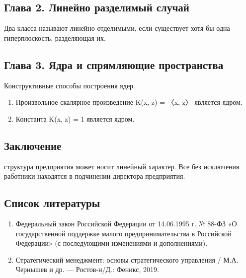 \documentclass[a4paper,14pt]{article} %
\begin{document}
\begin{center}
\section*{Глава 2. Линейно разделимый случай}
\end{center}
\par Два класса называют линейно отделимыми, если существует хотя бы одна
гиперплоскость, разделяющая их.
\newpage
\setcounter{subsection}{0}
\setcounter{equation}{0}
\setcounter{section}{0}

\begin{center}
\section*{Глава 3. Ядра и спрямляющие пространства}
\end{center}
Конструктивные способы построения ядер.
\begin{enumerate}
    \item Произвольное скалярное произведение K(x, z) = 〈x, z〉 является ядром.
    \item Константа K(x, z) = 1 является ядром.
\end{enumerate} 
\newpage
\setcounter{subsection}{0}
\setcounter{equation}{0}
\setcounter{section}{0}

\begin{center}
\section*{Заключение}
\end{center}
 структура предприятия может носит линейный характер. Все без исключения работники находятся в подчинении директора предприятия.
\newpage
\setcounter{subsection}{0}
\setcounter{equation}{0}
\setcounter{section}{0}

\begin{center}
\section*{Список литературы}
\end{center}
\begin{enumerate}
    \item Федеральный закон Российской Федерации от 14.06.1995 г. № 88-ФЗ «О государственной поддержке малого предпринимательства в Российской Федерации» (с последующими изменениями и дополнениями). 
    \item Стратегический менеджмент: основы стратегического управления / М.А. Чернышев и др. — Ростов-н/Д.: Феникс, 2019.
\end{enumerate}
\end{document}

